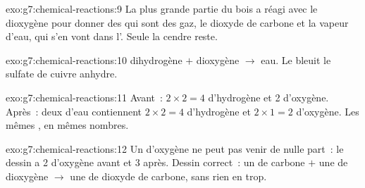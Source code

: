 \begin{solution}{exo:g7:chemical-reactions:9}
La plus grande partie du bois a réagi avec le dioxygène pour donner des
 qui sont des gaz, le dioxyde de carbone et la vapeur d'eau, qui
s'en vont dans l'. Seule la cendre reste.
\end{solution}

\begin{solution}{exo:g7:chemical-reactions:10}
dihydrogène $+$ dioxygène $\longrightarrow$ eau. Le  bleuit le
sulfate de cuivre anhydre.
\end{solution}

\begin{solution}{exo:g7:chemical-reactions:11}
Avant~: $2 \times 2 = 4$  d'hydrogène et 2  d'oxygène.
Après~: deux  d'eau contiennent $2 \times 2 = 4$ 
d'hydrogène et $2 \times 1 =
2$  d'oxygène. Les mêmes , en mêmes nombres.
\end{solution}

\begin{solution}{exo:g7:chemical-reactions:12}
Un  d'oxygène ne peut pas venir de nulle part~: le dessin a 2
 d'oxygène avant et 3 après. Dessin correct~: un  de carbone
$+$ une  de dioxygène $\longrightarrow$ une  de dioxyde
de carbone, sans rien en trop.
\end{solution}

